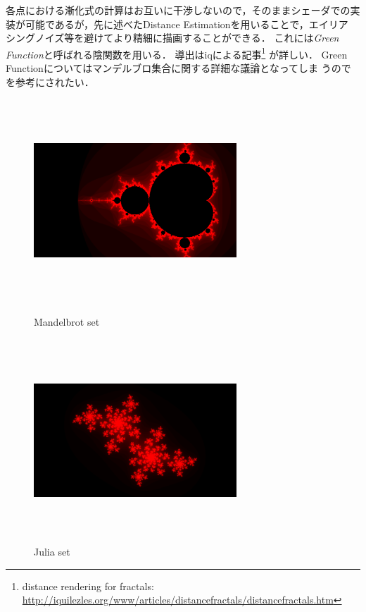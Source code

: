 各点における漸化式の計算はお互いに干渉しないので，そのままシェーダでの実
装が可能であるが，先に述べたDistance Estimationを用いることで，エイリア
シングノイズ等を避けてより精細に描画することができる．
これには\textit{Green Function}と呼ばれる陰関数を用いる．
導出はiqによる記事\footnote{distance rendering for fractals:
\url{http://iquilezles.org/www/articles/distancefractals/distancefractals.htm}}
が詳しい．
Green Functionについてはマンデルブロ集合に関する詳細な議論となってしま
うので\cite{douady1984exploring}を参考にされたい．

\begin{figure}[htbp]
 \begin{minipage}{0.49\hsize}
  \begin{center}
   \includegraphics[width=3in, height=3in, keepaspectratio]{../img/fractal/mandelbrot.pdf}
   \caption{Mandelbrot set}
   \label{fig:mandelbrot}
  \end{center}
 \end{minipage}
 \begin{minipage}{0.49\hsize}
     \includegraphics[width=3in, height=3in, keepaspectratio]{../img/fractal/julia.pdf}
   \caption{Julia set}
   \label{fig:julia}
 \end{minipage}
\end{figure}

